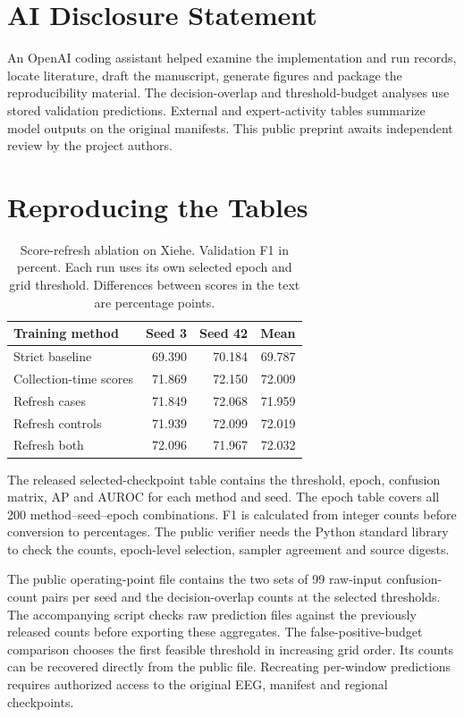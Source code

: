 \documentclass{article}
\begin{document}
\section*{AI Disclosure Statement}
An OpenAI coding assistant helped examine the implementation and run records, locate literature, draft the manuscript, generate figures and package the reproducibility material. The decision-overlap and threshold-budget analyses use stored validation predictions. External and expert-activity tables summarize model outputs on the original manifests. This public preprint awaits independent review by the project authors.




\clearpage
\appendix
\onecolumn
\section{Reproducing the Tables}
\begin{table}[t]\centering\small
\caption{Score-refresh ablation on Xiehe. Validation F1 in percent. Each run uses its own selected epoch and grid threshold. Differences between scores in the text are percentage points.}\label{tab:main}
\begin{tabular}{lrrr}\toprule
Training method & Seed 3 & Seed 42 & Mean\\\midrule
Strict baseline & 69.390 & 70.184 & 69.787\\
Collection-time scores & 71.869 & 72.150 & 72.009\\
Refresh cases & 71.849 & 72.068 & 71.959\\
Refresh controls & 71.939 & 72.099 & 72.019\\
Refresh both & 72.096 & 71.967 & 72.032\\\bottomrule
\end{tabular}
\end{table}
The released selected-checkpoint table contains the threshold, epoch, confusion matrix, AP and AUROC for each method and seed. The epoch table covers all 200 method--seed--epoch combinations. F1 is calculated from integer counts before conversion to percentages. The public verifier needs the Python standard library to check the counts, epoch-level selection, sampler agreement and source digests.

The public operating-point file contains the two sets of 99 raw-input confusion-count pairs per seed and the decision-overlap counts at the selected thresholds. The accompanying script checks raw prediction files against the previously released counts before exporting these aggregates. The false-positive-budget comparison chooses the first feasible threshold in increasing grid order. Its counts can be recovered directly from the public file. Recreating per-window predictions requires authorized access to the original EEG, manifest and regional checkpoints.
\end{document}
